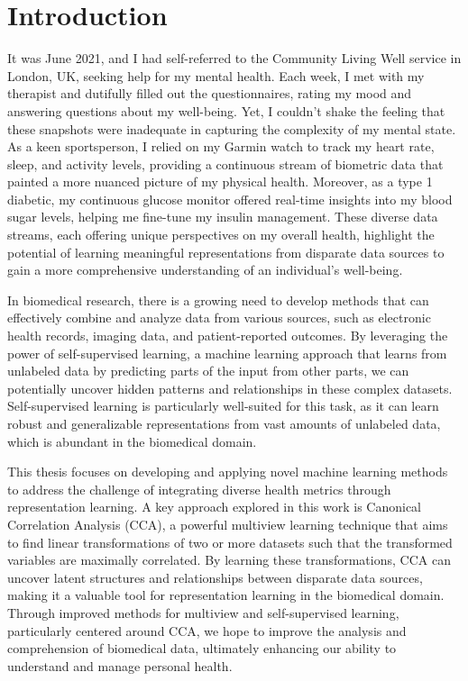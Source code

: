 \chapter{Introduction}\label{chap:introduction}
It was June 2021, and I had self-referred to the Community Living Well service in London, UK, seeking help for my mental health. Each week, I met with my therapist and dutifully filled out the questionnaires, rating my mood and answering questions about my well-being. Yet, I couldn't shake the feeling that these snapshots were inadequate in capturing the complexity of my mental state. As a keen sportsperson, I relied on my Garmin watch to track my heart rate, sleep, and activity levels, providing a continuous stream of biometric data that painted a more nuanced picture of my physical health. Moreover, as a type 1 diabetic, my continuous glucose monitor offered real-time insights into my blood sugar levels, helping me fine-tune my insulin management. These diverse data streams, each offering unique perspectives on my overall health, highlight the potential of learning meaningful representations from disparate data sources to gain a more comprehensive understanding of an individual's well-being.

In biomedical research, there is a growing need to develop methods that can effectively combine and analyze data from various sources, such as electronic health records, imaging data, and patient-reported outcomes. By leveraging the power of self-supervised learning, a machine learning approach that learns from unlabeled data by predicting parts of the input from other parts, we can potentially uncover hidden patterns and relationships in these complex datasets. Self-supervised learning is particularly well-suited for this task, as it can learn robust and generalizable representations from vast amounts of unlabeled data, which is abundant in the biomedical domain.

This thesis focuses on developing and applying novel machine learning methods to address the challenge of integrating diverse health metrics through representation learning. A key approach explored in this work is Canonical Correlation Analysis (CCA), a powerful multiview learning technique that aims to find linear transformations of two or more datasets such that the transformed variables are maximally correlated. By learning these transformations, CCA can uncover latent structures and relationships between disparate data sources, making it a valuable tool for representation learning in the biomedical domain. Through improved methods for multiview and self-supervised learning, particularly centered around CCA, we hope to improve the analysis and comprehension of biomedical data, ultimately enhancing our ability to understand and manage personal health.

